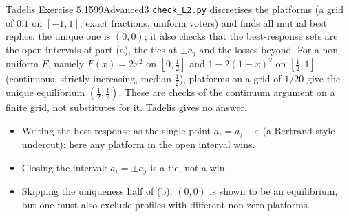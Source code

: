 \begin{exsol}{Tadelis Exercise 5.15}{99}{Advanced}{3}
\verify \texttt{check\_L2.py} discretises the platforms (a grid of $0.1$ on $[-1,1]$, exact fractions, uniform voters) and finds all mutual
best replies: the unique one is $(0,0)$; it also checks that the best-response sets are the open intervals of part (a), the ties at $\pm a_j$
and the losses beyond. For a non-uniform $F$, namely $F(x) = 2x^2$ on $[0, \tfrac12]$ and $1 - 2(1-x)^2$ on $[\tfrac12, 1]$ (continuous,
strictly increasing, median $\tfrac12$), platforms on a grid of $1/20$ give the unique equilibrium $(\tfrac12, \tfrac12)$. These are checks of the
continuum argument on a finite grid, not substitutes for it. Tadelis gives no answer.

\mistakes
\begin{itemize}
  \item Writing the best response as the single point $a_i = a_j - \varepsilon$ (a Bertrand-style undercut): here any platform in the open interval wins.
  \item Closing the interval: $a_i = \pm a_j$ is a tie, not a win.
  \item Skipping the uniqueness half of (b): $(0,0)$ is shown to be an equilibrium, but one must also exclude profiles with different non-zero platforms.
\end{itemize}
\end{exsol}
